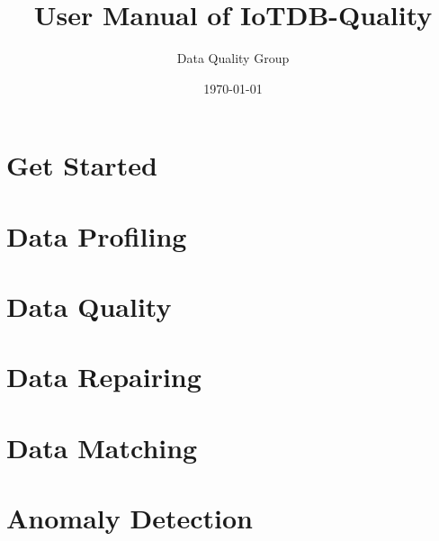 \documentclass[11pt,color=green,table]{elegantbook}
\title{User Manual of IoTDB-Quality}
\author{Data Quality Group}
\institute{School of Software, Tsinghua University}
\date{\today}
\begin{document}
\maketitle
\tableofcontents
\mainmatter

\chapter{Get Started}




\chapter{Data Profiling}
























\chapter{Data Quality}





\chapter{Data Repairing}





\chapter{Data Matching}







\chapter{Anomaly Detection}






\end{document}
